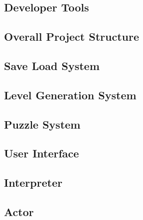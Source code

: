 \subsection{Developer Tools}

\newpage

\subsection{Overall Project Structure}

\newpage

\subsection{Save Load System}

\newpage

\subsection{Level Generation System}

\newpage

\subsection{Puzzle System}

\newpage

\subsection{User Interface}

\newpage

\subsection{Interpreter}
\label{section:interpreter}

\newpage

\subsection{Actor}

\newpage